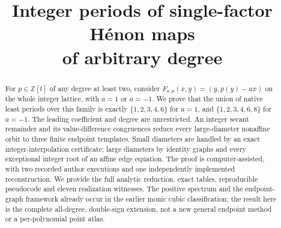 \documentclass[11pt]{article}
\title{Integer periods of single-factor H\'enon maps\\of arbitrary degree}
\author{}
\date{}
\theoremstyle{definition}
\newcommand{\ZZ}{\mathbb Z}
\numberwithin{equation}{section}
\begin{document}
\maketitle
\begin{abstract}
For $p\in\ZZ[t]$ of any degree at least two, consider
$F_{a,p}(x,y)=(y,p(y)-ax)$ on the whole integer lattice, with
$a=1$ or $a=-1$. We prove that the union of native least periods
over this family is exactly $\{1,2,3,4,6\}$ for $a=1$, and
$\{1,2,3,4,6,8\}$ for $a=-1$. The leading coefficient and degree
are unrestricted. An integer secant remainder and its value-difference
congruences reduce every large-diameter nonaffine orbit to three
finite endpoint templates. Small diameters are handled by an exact
integer-interpolation certificate; large diameters by identity graphs
and every exceptional integer root of an affine edge equation.
The proof is computer-assisted, with two recorded author executions
and one independently implemented reconstruction. We provide the full
analytic reduction, exact tables, reproducible pseudocode and eleven
realization witnesses. The positive spectrum and the endpoint-graph
framework already occur in the earlier monic cubic classification;
the result here is the complete all-degree, double-sign extension,
not a new general endpoint method or a per-polynomial point atlas.
\end{abstract}







\clearpage
\appendix




\end{document}
